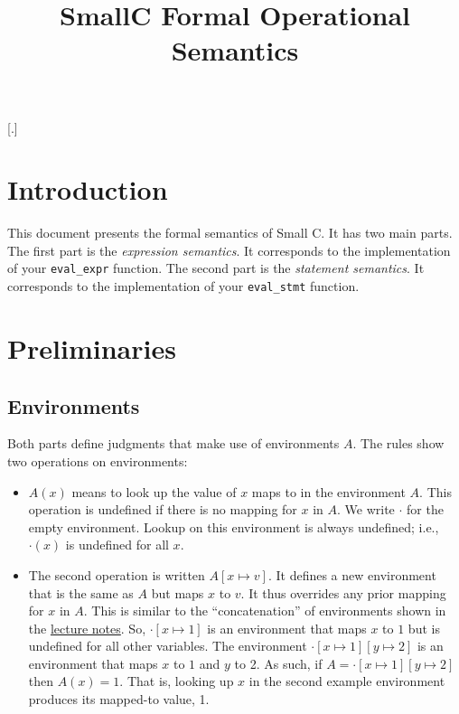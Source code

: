 \documentclass[10pt]{article}
\begin{document}
\title{%
  SmallC Formal Operational Semantics}

\maketitle

\newcommand{\config}[2][A]{{#1};{#2}}
[.]
\titlespacing*{\subsection}{\parindent}{1ex}{1em}

\section{Introduction}

This document presents the formal semantics of Small C. It has two main
parts. The first part is the \emph{expression semantics}. It
corresponds to the implementation of your \texttt{eval\_expr}
function. The second part is the \emph{statement semantics}. It
corresponds to the implementation of your \texttt{eval\_stmt}
function.

\section{Preliminaries}

\subsection{Environments}

Both parts define judgments that make use of environments $A$. The
rules show two operations on environments:
\begin{itemize}
\item $A(x)$ means to look up the value of $x$ maps to in the
  environment $A$. This operation is undefined if there is no mapping
  for $x$ in $A$.  We write $\cdot$ for the empty environment. Lookup
  on this environment is always undefined; i.e., $\cdot(x)$ is
  undefined for all $x$.
\item The second operation is written $A[ x \mapsto v ]$. It defines a
  new environment that is the same as $A$ but maps $x$ to $v$. It thus
  overrides any prior mapping for $x$ in $A$. This is similar to the
  ``concatenation'' of environments shown in the \href{https://bakalian.cs.umd.edu/330/slides}{lecture notes}. 
  So, $\cdot[ x \mapsto 1 ]$ is an environment that maps $x$
  to $1$ but is undefined for all other variables. The environment
  $\cdot[ x \mapsto 1][y \mapsto 2]$ is an environment that maps $x$
  to $1$ and $y$ to 2. As such, if
  $A = \cdot[ x \mapsto 1][y \mapsto 2]$ then $A(x) = 1$. That is,
  looking up $x$ in the second example environment produces its
  mapped-to value, 1.
\end{itemize}
\end{document}
